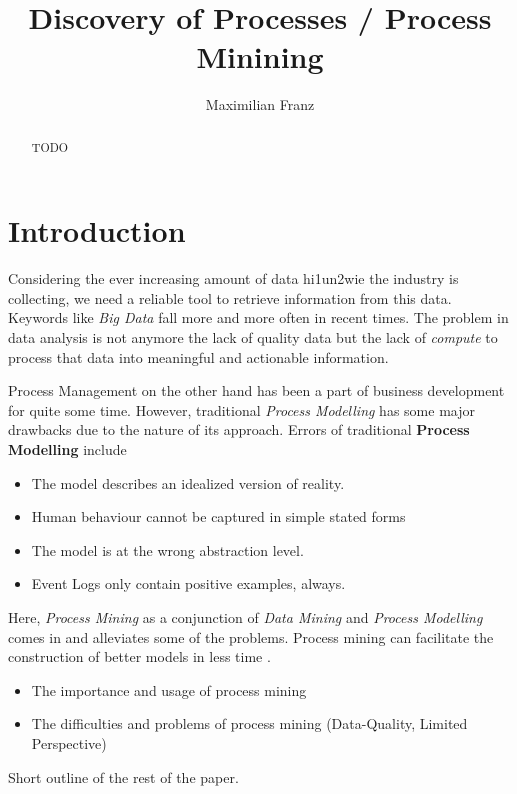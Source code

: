 \documentclass[a4paper]{IEEEtran}
\title{Discovery of Processes / Process Minining}
\author{Maximilian Franz}
\begin{document}
\maketitle

\begin{abstract}
TODO
\end{abstract}

\section{Introduction}
Considering the ever increasing amount of data \cite{manyika2011bigdata} \cite{hilbert2011worldcapacity}hi1un2wie
the industry is collecting, we need a reliable tool to retrieve information from this data. Keywords like \textit{Big Data} fall more and more often in recent times. The problem in data analysis is not anymore the lack of quality data but the lack of \textit{compute} to process that data into meaningful and actionable information. 

Process Management on the other hand has been a part of business development for quite some time. However, traditional \textit{Process Modelling} has some major drawbacks due to the nature of its approach. 
Errors of traditional \textbf{Process Modelling} include
\begin{itemize}
    \item The model describes an idealized version of reality.
    \item Human behaviour cannot be captured in simple stated forms
    \item The model is at the wrong abstraction level. 
    \item Event Logs only contain positive examples, always.
\end{itemize}
Here, \textit{Process Mining} as a conjunction of \textit{Data Mining} and \textit{Process Modelling} comes in and alleviates some of the problems. 
Process mining can facilitate the construction of better models in less time \cite{process_mining}.


\begin{itemize}
    \item The importance and usage of process mining 
    \item The difficulties and problems of process mining (Data-Quality, Limited Perspective)
\end{itemize}

Short outline of the rest of the paper.
\end{document}
